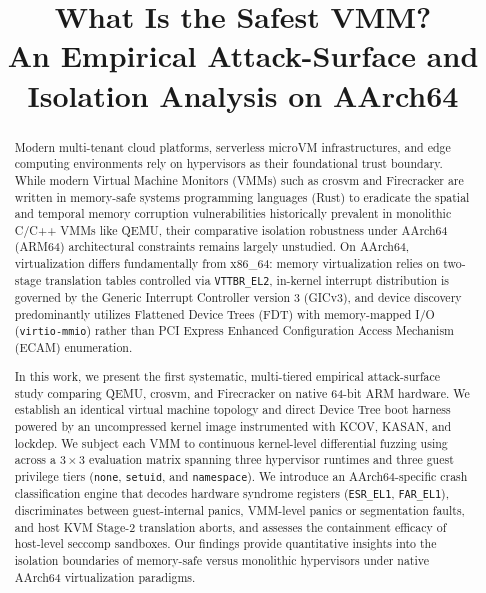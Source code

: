 \documentclass{article}
\title{What Is the Safest VMM? \\ An Empirical Attack-Surface and Isolation Analysis on AArch64}
\date{}
\begin{document}
\maketitle

\begin{abstract}
Modern multi-tenant cloud platforms, serverless microVM infrastructures, and edge computing environments rely on hypervisors as their foundational trust boundary. While modern Virtual Machine Monitors (VMMs) such as crosvm and Firecracker are written in memory-safe systems programming languages (Rust) to eradicate the spatial and temporal memory corruption vulnerabilities historically prevalent in monolithic C/C++ VMMs like QEMU, their comparative isolation robustness under \mbox{AArch64} (ARM64) architectural constraints remains largely unstudied. On AArch64, virtualization differs fundamentally from x86\_64: memory virtualization relies on two-stage translation tables controlled via \texttt{VTTBR\_EL2}, in-kernel interrupt distribution is governed by the Generic Interrupt Controller version 3 (GICv3), and device discovery predominantly utilizes Flattened Device Trees (FDT) with memory-mapped I/O (\texttt{virtio-mmio}) rather than PCI Express Enhanced Configuration Access Mechanism (ECAM) enumeration.

In this work, we present the first systematic, multi-tiered empirical attack-surface study comparing QEMU, crosvm, and Firecracker on native 64-bit ARM hardware. We establish an identical virtual machine topology and direct Device Tree boot harness powered by an uncompressed kernel image instrumented with KCOV, KASAN, and lockdep. We subject each VMM to continuous kernel-level differential fuzzing using \syzkaller across a $3 \times 3$ evaluation matrix spanning three hypervisor runtimes and three guest privilege tiers (\texttt{none}, \texttt{setuid}, and \texttt{namespace}). We introduce an AArch64-specific crash classification engine that decodes hardware syndrome registers (\texttt{ESR\_EL1}, \texttt{FAR\_EL1}), discriminates between guest-internal panics, VMM-level panics or segmentation faults, and host KVM Stage-2 translation aborts, and assesses the containment efficacy of host-level seccomp sandboxes. Our findings provide quantitative insights into the isolation boundaries of memory-safe versus monolithic hypervisors under native AArch64 virtualization paradigms.
\end{abstract}

\end{document}
